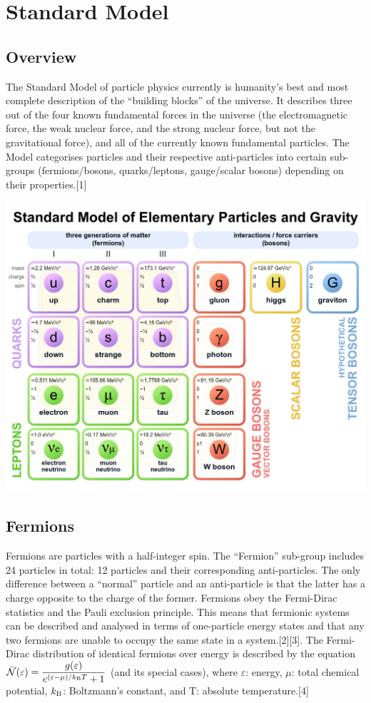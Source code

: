 \documentclass{article}
\begin{document}
\section{Standard Model}
\large
\subsection{Overview}
The Standard Model of particle physics currently is humanity’s best and most complete description of the “building blocks” of the universe. It describes three out of the four known fundamental forces in the universe (the electromagnetic force, the weak nuclear force, and the strong nuclear force, but not the gravitational force), and all of the currently known fundamental particles. The Model categorises particles and their respective anti-particles into certain sub-groups (fermions/bosons, quarks/leptons, gauge/scalar bosons) depending on their properties.[1]

\begin{center}
    \includegraphics[scale=0.16]{partic.jpg}
\end{center}

\subsection{Fermions}
Fermions are particles with a half-integer spin. The “Fermion” sub-group includes 24 particles in total: 12 particles and their corresponding anti-particles. The only difference between a “normal” particle and an anti-particle is that the latter has a charge opposite to the charge of the former. Fermions obey the Fermi-Dirac statistics and the Pauli exclusion principle. This means that fermionic systems can be described and analysed in terms of one-particle energy states and that any two fermions are unable to occupy the same state in a system.[2][3]. The Fermi-Dirac distribution of identical fermions over energy is described by the equation ${\displaystyle {\bar {\mathcal {N}}}(\varepsilon )={\frac {g(\varepsilon )}{e^{(\varepsilon -\mu )/k_{\rm {B}}T}+1}}}$ (and its special cases), where $\varepsilon$: energy, $\mu$: total chemical potential, $k_{\rm {B}}$: Boltzmann’s constant, and T: absolute temperature.[4]
\pagebreak
\end{document}
